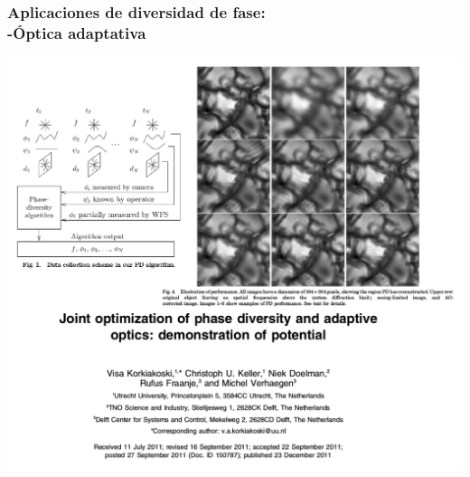 \documentclass[serif,8pt]{beamer}
\begin{document}

		
		\begin{frame}
		\frametitle{Aplicaciones de diversidad de fase:\\ -Óptica adaptativa}
			\begin{center}
				\includegraphics[scale=0.4]{img/PDAO.pdf}
			\end{center}
		\end{frame}
		
\end{document}

